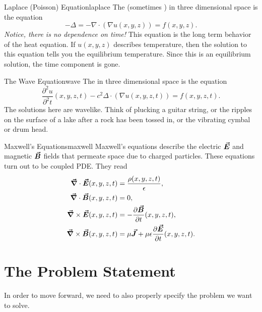         \begin{ex}{Laplace (Poisson) Equation}{laplace}
        The  (sometimes )  in three dimensional space is the equation
        \[
        -\Delta=-\nabla \cdot (\nabla u(x,y,z))=f(x,y,z).
        \]
        \emph{Notice, there is no dependence on time!} This equation is the long term behavior of the heat equation.  If $u(x,y,z)$ describes temperature, then the solution to this equation tells you the equilibrium temperature. Since this is an equilibrium solution, the time component is gone.
        \end{ex}
        
        \begin{ex}{The Wave Equation}{wave}
        The  in three dimensional space is the equation
        \[
        \frac{\partial^2 u}{\partial^2 t}(x,y,z,t) -c^2\Delta \cdot (\nabla u(x,y,z,t)) = f(x,y,z,t).
        \]
        The solutions here are wavelike.  Think of plucking a guitar string, or the ripples on the surface of a lake after a rock has been tossed in, or the vibrating cymbal or drum head.
        \end{ex}
        
        \begin{ex}{Maxwell's Equations}{maxwell}
        Maxwell's equations describe the electric $\boldsymbol{\vec{E}}$ and magnetic $\boldsymbol{\vec{B}}$ fields that permeate space due to charged particles.  These equations turn out to be coupled PDE.  They read
        \begin{align*}
            \boldsymbol{\vec{\nabla}} \cdot \boldsymbol{\vec{E}}(x,y,z,t) &= \frac{\rho(x,y,z,t)}{\epsilon},\\
            \boldsymbol{\vec{\nabla}} \cdot \boldsymbol{\vec{B}}(x,y,z,t) &= 0,\\
            \boldsymbol{\vec{\nabla}} \times \boldsymbol{\vec{E}}(x,y,z,t) &= -\frac{\partial \boldsymbol{\vec{B}}}{\partial t}(x,y,z,t),\\
            \boldsymbol{\vec{\nabla}} \times \boldsymbol{\vec{B}}(x,y,z,t) &= \mu \boldsymbol{\vec{J}} + \mu \epsilon \frac{\partial \boldsymbol{\vec{E}}}{\partial t}(x,y,z,t).
        \end{align*}
        \end{ex}
        
        \section{The Problem Statement}
        
        In order to move forward, we need to also properly specify the problem we want to solve.
        
